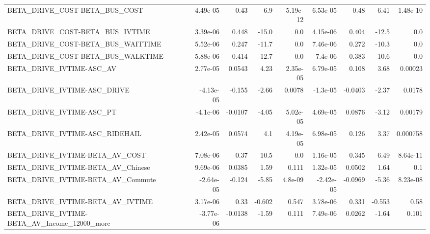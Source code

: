 \begin{tabular}{lrrrrrrrr}
BETA\_DRIVE\_COST-BETA\_BUS\_COST                      &    4.49e-05 &         0.43 &      6.9 & 5.19e-12 &   6.53e-05 &        0.48 &         6.41 &      1.48e-10 \\
BETA\_DRIVE\_COST-BETA\_BUS\_IVTIME                    &    3.39e-06 &        0.448 &    -15.0 &      0.0 &   4.15e-06 &       0.404 &        -12.5 &           0.0 \\
BETA\_DRIVE\_COST-BETA\_BUS\_WAITTIME                  &    5.52e-06 &        0.247 &    -11.7 &      0.0 &   7.46e-06 &       0.272 &        -10.3 &           0.0 \\
BETA\_DRIVE\_COST-BETA\_BUS\_WALKTIME                  &    5.88e-06 &        0.414 &    -12.7 &      0.0 &    7.4e-06 &       0.383 &        -10.6 &           0.0 \\
BETA\_DRIVE\_IVTIME-ASC\_AV                           &    2.77e-05 &       0.0543 &     4.23 & 2.35e-05 &   6.79e-05 &       0.108 &         3.68 &       0.00023 \\
BETA\_DRIVE\_IVTIME-ASC\_DRIVE                        &   -4.13e-05 &       -0.155 &    -2.66 &   0.0078 &   -1.3e-05 &     -0.0403 &        -2.37 &        0.0178 \\
BETA\_DRIVE\_IVTIME-ASC\_PT                           &    -4.1e-06 &      -0.0107 &    -4.05 & 5.02e-05 &   4.69e-05 &      0.0876 &        -3.12 &       0.00179 \\
BETA\_DRIVE\_IVTIME-ASC\_RIDEHAIL                     &    2.42e-05 &       0.0574 &      4.1 & 4.19e-05 &   6.98e-05 &       0.126 &         3.37 &      0.000758 \\
BETA\_DRIVE\_IVTIME-BETA\_AV\_COST                     &    7.08e-06 &         0.37 &     10.5 &      0.0 &   1.16e-05 &       0.345 &         6.49 &      8.64e-11 \\
BETA\_DRIVE\_IVTIME-BETA\_AV\_Chinese                  &    9.69e-06 &       0.0385 &     1.59 &    0.111 &   1.32e-05 &      0.0502 &         1.64 &           0.1 \\
BETA\_DRIVE\_IVTIME-BETA\_AV\_Commute                  &   -2.64e-05 &       -0.124 &    -5.85 &  4.8e-09 &  -2.42e-05 &     -0.0969 &        -5.36 &      8.23e-08 \\
BETA\_DRIVE\_IVTIME-BETA\_AV\_IVTIME                   &    3.17e-06 &         0.33 &   -0.602 &    0.547 &   3.78e-06 &       0.331 &       -0.553 &          0.58 \\
BETA\_DRIVE\_IVTIME-BETA\_AV\_Income\_12000\_more        &   -3.77e-06 &      -0.0138 &    -1.59 &    0.111 &   7.49e-06 &      0.0262 &        -1.64 &         0.101 \\

\end{tabular}
